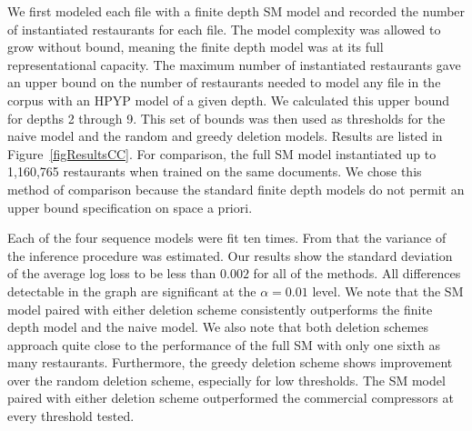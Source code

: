 
We first modeled each file with a finite depth SM model and recorded the number of instantiated restaurants for each file.  The model complexity was allowed to grow without bound, meaning the finite depth model was at its full representational capacity.  The maximum number of instantiated restaurants gave an upper bound on the number of restaurants needed to model any file in the corpus with an HPYP model of a given depth.  We calculated this upper bound for depths 2 through 9.  This set of bounds was then used as thresholds for the naive model and the random and greedy deletion models.  Results are listed in Figure~\ref{figResultsCC}.  For comparison, the full SM model instantiated up to 1,160,765 restaurants when trained on the same documents.  We chose this method of comparison because the standard finite depth models do not permit an upper bound specification on space a priori.

Each of the four sequence models were fit ten times.  From that the variance of the inference procedure was estimated.  Our results show the standard deviation of the average log loss to be less than $0.002$ for all of the methods.  All differences detectable in the graph are significant at the $\alpha = 0.01$ level. We note that the SM model paired with either deletion scheme consistently outperforms the finite depth model and the naive model.  We also note that both deletion schemes approach quite close to the performance of the full SM with only one sixth as many restaurants.  Furthermore, the greedy deletion scheme shows improvement over the random deletion scheme, especially for low thresholds.  The SM model paired with either deletion scheme outperformed the commercial compressors at every threshold tested.